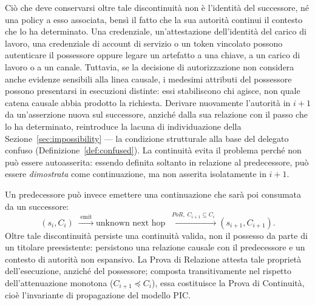 \documentclass[11pt]{article}
\begin{document}
Ciò che deve conservarsi oltre tale discontinuità non è l'identità del
successore, né una policy a esso associata, bensì il fatto che la sua autorità
continui il contesto che lo ha determinato. Una credenziale, un'attestazione
dell'identità del carico di lavoro, una credenziale di account di servizio o un
token vincolato possono autenticare il possessore oppure legare un artefatto a
una chiave, a un carico di lavoro o a un canale. Tuttavia, se la decisione di
autorizzazione non considera anche evidenze sensibili alla linea causale, i
medesimi attributi del possessore possono presentarsi in esecuzioni distinte:
essi stabiliscono chi agisce, non quale catena causale abbia prodotto la
richiesta. Derivare nuovamente l'autorità in $i+1$ da un'asserzione nuova sul
successore, anziché dalla sua relazione con il passo che lo ha determinato,
reintroduce la lacuna di individuazione della
Sezione~\ref{sec:impossibility} --- la condizione strutturale alla base del
delegato confuso (Definizione~\ref{def:confused}). La continuità evita il
problema perché non può essere autoasserita: essendo definita soltanto in
relazione al predecessore, può essere \emph{dimostrata} come continuazione, ma
non asserita isolatamente in $i+1$.

Un predecessore può invece emettere una continuazione che sarà poi consumata da
un successore:
\[
(s_i,C_i)
\;\xrightarrow{\;\mathrm{emit}\;}
\text{unknown next hop}
\;\xrightarrow{\;PoR,\; C_{i+1}\subseteq C_i\;}
(s_{i+1},C_{i+1}).
\]
Oltre tale discontinuità persiste una continuità valida, non il possesso da
parte di un titolare preesistente: persistono una relazione causale con il
predecessore e un contesto di autorità non espansivo. La Prova di Relazione
attesta tale proprietà dell'esecuzione, anziché del possessore; composta
transitivamente nel rispetto dell'attenuazione monotona
($C_{i+1} \preceq C_i$), essa costituisce la Prova di Continuità, cioè
l'invariante di propagazione del modello PIC.
\end{document}
